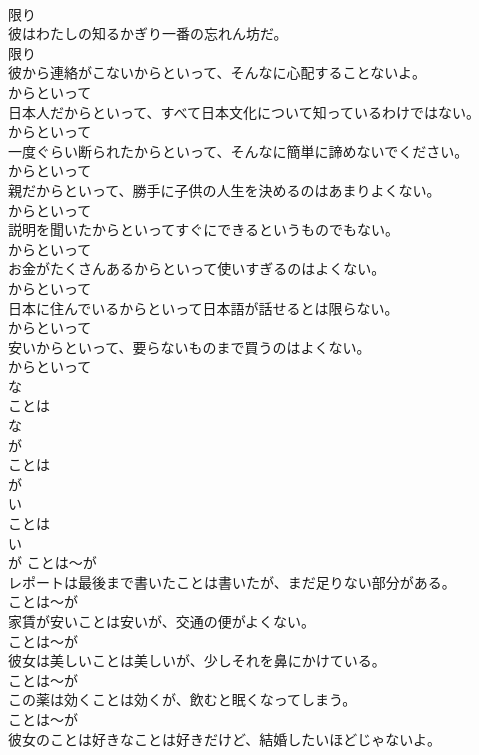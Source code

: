 \documentclass[8pt]{extreport}
\begin{document}
\begin{CJK}{UTF8}{min}
\\	限り
\\	彼はわたしの知るかぎり一番の忘れん坊だ。	
\\	限り
\\	彼から連絡がこないからといって、そんなに心配することないよ。	
\\	からといって
\\	日本人だからといって、すべて日本文化について知っているわけではない。	
\\	からといって
\\	一度ぐらい断られたからといって、そんなに簡単に諦めないでください。	
\\	からといって
\\	親だからといって、勝手に子供の人生を決めるのはあまりよくない。	
\\	からといって
\\	説明を聞いたからといってすぐにできるというものでもない。	
\\	からといって
\\	お金がたくさんあるからといって使いすぎるのはよくない。	
\\	からといって
\\	日本に住んでいるからといって日本語が話せるとは限らない。	
\\	からといって
\\	安いからといって、要らないものまで買うのはよくない。	
\\	からといって
\\	な
\\	ことは 
\\	な
\\	が	
\\	ことは 
\\	が	
\\	い
\\	ことは 
\\	い
\\	が	ことは～が
\\	レポートは最後まで書いたことは書いたが、まだ足りない部分がある。	
\\	ことは～が
\\	家賃が安いことは安いが、交通の便がよくない。	
\\	ことは～が
\\	彼女は美しいことは美しいが、少しそれを鼻にかけている。	
\\	ことは～が
\\	この薬は効くことは効くが、飲むと眠くなってしまう。	
\\	ことは～が
\\	彼女のことは好きなことは好きだけど、結婚したいほどじゃないよ。	

\end{CJK}
\end{document}
